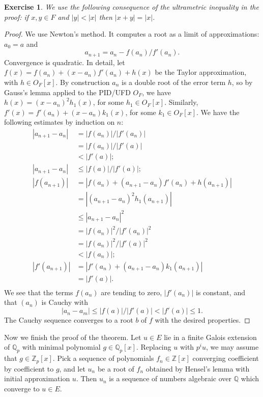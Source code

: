 \documentclass{amsart}
\newcommand{\ring}[1]{\mathbb{#1}}
\newtheorem{exercise}{Exercise}
\def\abs#1{{|#1|}}
\begin{document}
\begin{exercise}  We use the following consequence
of the ultrametric inequality in the proof: if $x,y\in F$
and $\abs{y}<\abs{x}$ then $\abs{x + y}  = \abs{x}$.
\end{exercise}

\begin{proof} We use Newton's method.  It computes a root as a limit
of approximations:  $a_0=a$ and
\[
 a_{n+1} = a_n - f(a_n)/f'(a_n).
\]
Convergence is quadratic.  In detail, let $f(x) = f(a_n) + (x-a_n)
f'(a_n) + h(x)$ be the Taylor approximation, with $h\in O_F[x]$.  By
construction $a_n$ is a double root of the error term $h$, 
so by Gauss's lemma \cite[8.18]{knapp-basic}
applied to the PID/UFD $O_F$, we have $h(x) = (x-a_n)^2 h_1(x)$, for
some $h_1\in O_F[x]$. Similarly, $f'(x)=f'(a_n)+(x-a_n)k_1(x)$, for some $k_1\in O_F[x]$.
We have the following estimates by induction on $n$:
\begin{align*}
\abs{a_{n+1}-a_n} &= \abs{f(a_n)}/\abs{f'(a_{n})} \\
   &= \abs{f(a_n)}/\abs{f'(a)}\\
   &< \abs{f'(a)};\\
\abs{a_{n+1}-a_n} &\le \abs{f(a)}/\abs{f'(a)};\\
\abs{f(a_{n+1})} &= \abs{f(a_n) +(a_{n+1}-a_n) f'(a_n) + h(a_{n+1})}\\
 &= \abs{(a_{n+1}-a_n)^2h_1(a_{n+1})}\\
 &\le \abs{a_{n+1}-a_n}^2\\
 &= \abs{f(a_n)}^2/\abs{f'(a_{n})}^2\\
 &= \abs{f(a_n)}^2/\abs{f'(a)}^2\\
 &< \abs{f(a_n)};\\
\abs{f'(a_{n+1})} &= \abs{f'(a_{n}) + (a_{n+1}-a_n) k_1(a_{n+1})} \\
  &=\abs{f'(a)}.\\
\end{align*}
We see that the terms $f(a_n)$ are tending to zero, $\abs{f'(a_n)}$ is
constant, and that $(a_n)$ is Cauchy with 
\[
\abs{a_n-a_m}\le
\abs{f(a)}/\abs{f'(a)}< \abs{f'(a)}\le 1.
\]  The Cauchy sequence converges to a root $b$ of $f$ with the desired properties.
\end{proof}

Now we finish the proof of the theorem.  Let $u\in E$ lie in a finite Galois
extension of $\ring{Q}_p$ with minimal polynomial $g\in \ring{Q}_p[x]$.  Replacing
$u$ with $p^i u$, we may assume that $g\in \ring{Z}_p[x]$.  Pick a sequence
of polynomials $f_n\in\ring{Z}[x]$ converging coefficient by coefficient to 
$g$, and let $u_n$ be a root of $f_n$ obtained by Hensel's lemma with initial
approximation $u$.  Then $u_n$ is a sequence of numbers algebraic over $\ring{Q}$
which converge to $u\in E$.
\end{document}

